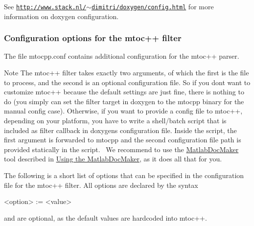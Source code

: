 See \href{http://www.stack.nl/~dimitri/doxygen/config.html}{\tt http\+://www.\+stack.\+nl/$\sim$dimitri/doxygen/config.\+html} for more information on doxygen configuration.\hypertarget{tools_config_mtocpp}{}\subsubsection{Configuration options for the mtoc++ filter}\label{tools_config_mtocpp}
The file {\ttfamily mtocpp.\+conf} contains additional configuration for the mtoc++ parser.

\begin{DoxyNote}{Note}
The mtoc++ filter takes exactly two arguments, of which the first is the file to process, and the second is an optional configuration file. So if you dont want to customize mtoc++ because the default settings are just fine, there is nothing to do (you simply can set the filter target in doxygen to the {\ttfamily mtocpp} binary for the manual config case). Otherwise, if you want to provide a config file to mtoc++, depending on your platform, you have to write a shell/batch script that is included as filter callback in doxygen\textquotesingle{}s configuration file. Inside the script, the first argument is forwarded to {\ttfamily mtocpp} and the second configuration file path is provided statically in the script.~\newline
 We recommend to use the \hyperlink{class_matlab_doc_maker}{Matlab\+Doc\+Maker} tool described in \hyperlink{tools_tools_docmaker}{Using the Matlab\+Doc\+Maker}, as it does all that for you.
\end{DoxyNote}
The following is a short list of options that can be specified in the configuration file for the mtoc++ filter. All options are declared by the syntax
\begin{DoxyCode}
<option> := <value> 
\end{DoxyCode}
 and are optional, as the default values are hardcoded into mtoc++.

